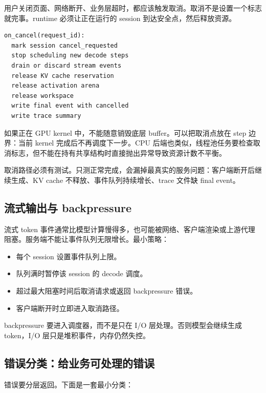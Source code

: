 用户关闭页面、网络断开、业务层超时，都应该触发取消。取消不是设置一个标志就完事。runtime 必须让正在运行的 session 到达安全点，然后释放资源。

\begin{lstlisting}[numbers=none,caption={取消处理的资源清单}]
on_cancel(request_id):
  mark session cancel_requested
  stop scheduling new decode steps
  drain or discard stream events
  release KV cache reservation
  release activation arena
  release workspace
  write final event with cancelled
  write trace summary
\end{lstlisting}

如果正在 GPU kernel 中，不能随意销毁底层 buffer。可以把取消点放在 step 边界：当前 kernel 完成后不再调度下一步。CPU 后端也类似，线程池任务要检查取消标志，但不能在持有共享结构时直接抛出异常导致资源计数不平衡。

\begin{warningbox}
取消路径必须有测试。只测正常完成，会漏掉最真实的服务问题：客户端断开后继续生成、KV cache 不释放、事件队列持续增长、trace 文件缺 final event。
\end{warningbox}

\subsection{流式输出与 backpressure}

流式 token 事件通常比模型计算慢得多，也可能被网络、客户端渲染或上游代理阻塞。服务端不能让事件队列无限增长。最小策略：

\begin{itemize}
  \item 每个 session 设置事件队列上限。
  \item 队列满时暂停该 session 的 decode 调度。
  \item 超过最大阻塞时间后取消请求或返回 backpressure 错误。
  \item 客户端断开时立即进入取消路径。
\end{itemize}

backpressure 要进入调度器，而不是只在 I/O 层处理。否则模型会继续生成 token，I/O 层只是堆积事件，内存仍然失控。

\subsection{错误分类：给业务可处理的错误}

错误要分层返回。下面是一套最小分类：

